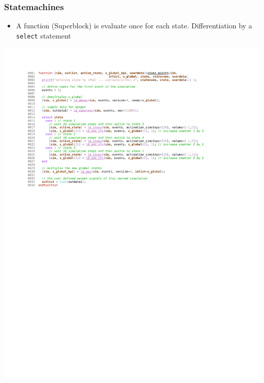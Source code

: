 \documentclass[serif,9pt,xcolor=dvipsnames]{beamer}
\begin{document}
\begin{frame}
  \frametitle{Statemachines}

\begin{itemize}
 \item A function (Superblock) is evaluate once for each state. Differentiation by a \texttt{select} statement
\end{itemize}
  

\centering \includegraphics[trim=2.7cm 9.5cm 4cm 1.4cm, clip, width=1.0\linewidth]{figures/state_mainfn.pdf} 

\end{frame}
\end{document}
